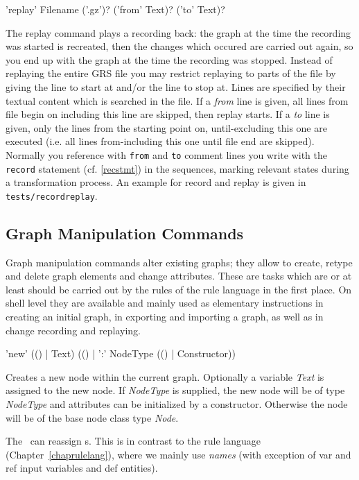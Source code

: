\begin{rail}
  'replay' Filename ('.gz')? ('from' Text)? ('to' Text)?
\end{rail}
The replay command plays a recording back: the graph at the time the recording was started is recreated, then the changes which occured are carried out again, so you end up with the graph at the time the recording was stopped. Instead of replaying the entire GRS file you may restrict replaying to parts of the file by giving the line to start at and/or the line to stop at. Lines are specified by their textual content which is searched in the file.
If a \emph{from} line is given, all lines from file begin on including this line are skipped, then replay starts. If a \emph{to} line is given, only the lines from the starting point on, until-excluding this one are executed (i.e. all lines from-including this one until file end are skipped).
Normally you reference with \texttt{from} and \texttt{to} comment lines you write with the \texttt{record} statement (cf. \ref{recstmt}) in the sequences, marking relevant states during a transformation process.
An example for record and replay is given in \texttt{tests/recordreplay}.

\subsection{Graph Manipulation Commands}
\label{mani}
Graph manipulation commands alter existing graphs;
they allow to create, retype and delete graph elements and change attributes. 
These are tasks which are or at least should be carried out by the rules of the rule language in the first place.
On shell level they are available and mainly used as elementary instructions in creating an initial graph, in exporting and importing a graph, as well as in change recording and replaying.

\begin{rail}
  'new' (() | Text) (() | ':' NodeType (() | Constructor))
\end{rail}
Creates a new node within the current graph.
Optionally a variable \emph{Text} is assigned to the new node.
If \emph{NodeType} is supplied, the new node will be of type \emph{NodeType} and attributes can be initialized by a constructor.
Otherwise the node will be of the base node class type \emph{Node}.
\begin{note}
The \GrShell\ can reassign s. 
This is in contrast to the rule language (Chapter~\ref{chaprulelang}), where we mainly use \emph{names}
(with exception of var and ref input variables and def entities).
\end{note}


